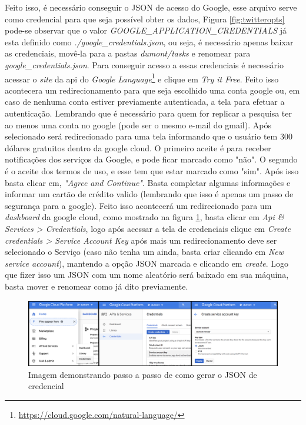 Feito isso, é necessário conseguir o JSON de acesso do Google, esse arquivo serve como credencial para que seja possível obter os dados, Figura \ref{fig:twitteropts} pode-se observar que o valor \textit{GOOGLE\_APPLICATION\_CREDENTIALS} já esta definido como \textit{./google\_credentials.json}, ou seja, é necessário apenas baixar as credenciais, movê-la para a pastas \textit{dumont/tasks} e renomear para \textit{google\_credentials.json}. Para conseguir acesso a essas credenciais é necessário acessar o \textit{site} da api do \textit{Google Language}\footnote{\url{https://cloud.google.com/natural-language/}} e clique em \textit{Try it Free}. Feito isso acontecera um redirecionamento para que seja escolhido uma conta google ou, em caso de nenhuma conta estiver previamente autenticada, a tela para efetuar a autenticação. Lembrando que é necessário para quem for replicar a pesquisa ter ao menos uma conta no google (pode ser o mesmo e-mail do gmail). Após selecionado será redirecionado para uma tela informando que o usuário tem 300 dólares gratuitos dentro da google cloud. O primeiro aceite é para receber notificações dos serviços da Google, e pode ficar marcado como "não". O segundo é o aceite dos termos de uso, e esse tem que estar marcado como "sim". Após isso basta clicar em, \textit{"Agree and Continue"}. Basta completar algumas informações e informar um cartão de crédito valido (lembrando que isso é apenas um passo de segurança para a google). Feito isso acontecerá um redirecionado para um \textit{dashboard} da google cloud, como mostrado na figura \ref{fig:googleflow}, basta clicar em \textit{Api \& Services > Credentials}, logo após acessar a tela de credenciais clique em \textit{Create credentials > Service Account Key} após mais um redirecionamento deve ser selecionado o Serviço (caso não tenha um ainda, basta criar clicando em \textit{New service account}), mantendo a opção JSON marcada e clicando em \textit{create}. Logo que fizer isso um JSON com um nome aleatório será baixado em sua máquina, basta mover e renomear como já dito previamente.

\begin{figure}[!ht]
    \centering
    \includegraphics[width=.8\textwidth]{imagens/googleflow.png}
    \caption{Imagem demonstrando passo a passo de como gerar o JSON de credencial}
    \label{fig:googleflow}
\end{figure}
